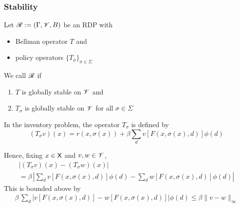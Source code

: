 \begin{frame}
    \frametitle{Stability}
    
    Let $\mathscr R := (\Gamma, \mathscr V, B)$ be an RDP with 
    \begin{itemize}
        \item Bellman operator $T$ and 
        \item policy operators $\{T_\sigma\}_{\sigma \in \Sigma}$
    \end{itemize}


        \vspace{0.5em}
        \vspace{0.5em}
        \vspace{0.5em}
    We call $\mathscr R$  if
    \begin{enumerate}
        \item $T$ is globally stable on $\mathscr V$ and
        \vspace{0.5em}
        \item $T_\sigma$ is globally stable on $\mathscr V$ for all $\sigma \in \Sigma$
    \end{enumerate}

\end{frame}


\begin{frame}
    
    \Eg In the inventory problem, the operator $T_\sigma$ is defined by 
    \begin{equation*}
        (T_\sigma v)(x)
        = r(x, \sigma(x))
                + \beta
                \sum_d v [F(x, \sigma(x), d) ] \phi(d)
    \end{equation*}

    Hence, fixing $x \in \mathsf X$ and $v, w \in \mathscr V$,
    \begin{multline*}
        |(T_\sigma v)(x) -(T_\sigma w)(x)|
        \\ 
        =
        \beta \,
        \left| 
            \sum_d v [F(x, \sigma(x), d) ] \phi(d)
            - \sum_d w [F(x, \sigma(x), d) ] \phi(d)
        \right|
    \end{multline*}
    This is bounded above by 
    \begin{align*}
        \beta \,
        \sum_d
        \left| 
            v [F(x, \sigma(x), d) ]
            -w [F(x, \sigma(x), d) ]
        \right| \phi(d)
        \leq \beta \| v - w\|_\infty
    \end{align*}

\end{frame}


